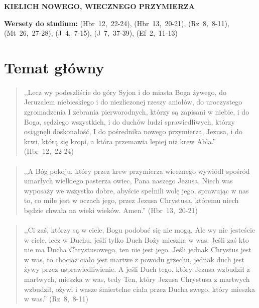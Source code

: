 \documentclass[10pt,a4paper,oneside]{article}
\begin{document}
\centerline{\textbf{\MakeUppercase{Kielich nowego, wiecznego przymierza}}}
\begin{center}
\textbf{Wersety do studium:} 
\mbox{(Hbr 12, 22-24)}, \mbox{(Hbr 13, 20-21)}, \mbox{(Rz 8, 8-11)}, \mbox{(Mt 26, 27-28)}, \mbox{(J 4, 7-15)}, \mbox{(J 7, 37-39)}, \mbox{(Ef 2, 11-13)}
\end{center}
\section{Temat główny}
\paragraph{}
\begin{quote}
,,Lecz wy podeszliście do góry Syjon i do miasta Boga żywego, do Jeruzalem niebieskiego i do niezliczonej rzeszy aniołów, do uroczystego zgromadzenia I zebrania pierworodnych, którzy są zapisani w niebie, i do Boga, sędziego wszystkich, i do duchów ludzi sprawiedliwych, którzy osiągnęli doskonałość, I do pośrednika nowego przymierza, Jezusa, i do krwi, którą się kropi, a która przemawia lepiej niż krew Abla.'' \mbox{(Hbr 12, 22-24)}
\end{quote}
\paragraph{}
\begin{quote}
,,A Bóg pokoju, który przez krew przymierza wiecznego wywiódł spośród umarłych wielkiego pasterza owiec, Pana naszego Jezusa, Niech was wyposaży we wszystko dobre, abyście spełnili wolę jego, sprawując w nas to, co miłe jest w oczach jego, przez Jezusa Chrystusa, któremu niech będzie chwała na wieki wieków. Amen.'' \mbox{(Hbr 13, 20-21)}
\end{quote}
\paragraph{}
\begin{quote}
,,Ci zaś, którzy są w ciele, Bogu podobać się nie mogą. Ale wy nie jesteście w ciele, lecz w Duchu, jeśli tylko Duch Boży mieszka w was. Jeśli zaś kto nie ma Ducha Chrystusowego, ten nie jest jego. Jeśli jednak Chrystus jest w was, to chociaż ciało jest martwe z powodu grzechu, jednak duch jest żywy przez usprawiedliwienie. A jeśli Duch tego, który Jezusa wzbudził z martwych, mieszka w was, tedy Ten, który Jezusa Chrystusa z martwych wzbudził, ożywi i wasze śmiertelne ciała przez Ducha swego, który mieszka w was.'' \mbox{(Rz 8, 8-11)}
\end{quote}
\end{document}
